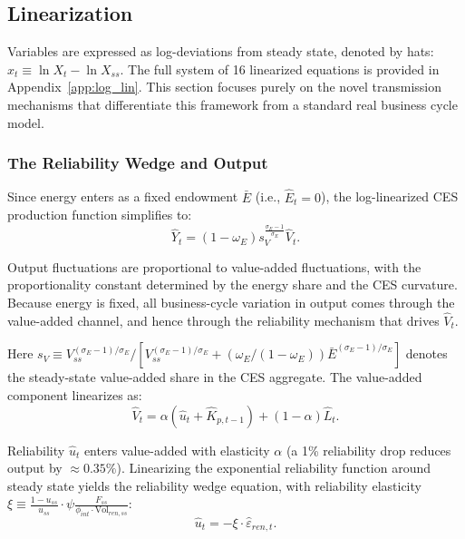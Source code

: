 	

	\subsection{Linearization}

Variables are expressed as log-deviations from steady state, denoted by hats: $\hat{x}_t \equiv \ln X_t - \ln X_{ss}$. The full system of 16 linearized equations is provided in Appendix~\ref{app:log_lin}. This section focuses purely on the novel transmission mechanisms that differentiate this framework from a standard real business cycle model.

\subsubsection{The Reliability Wedge and Output}

Since energy enters as a fixed endowment $\bar{E}$ (i.e., $\hat{E}_t = 0$), the log-linearized CES production function simplifies to:
	\begin{equation}
		\hat{Y}_t = (1-\omega_E) s_V^{\frac{\sigma_E - 1}{\sigma_E}} \hat{V}_t
		\label{eq:output_lin}.
	\end{equation}
	
	Output fluctuations are proportional to value-added fluctuations, with the proportionality constant determined by the energy share and the CES curvature. Because energy is fixed, all business-cycle variation in output comes through the value-added channel, and hence through the reliability mechanism that drives $\hat{V}_t$.
	
	Here $s_V \equiv V_{ss}^{(\sigma_E-1)/\sigma_E} / [V_{ss}^{(\sigma_E-1)/\sigma_E} + (\omega_E/(1-\omega_E)) \bar{E}^{(\sigma_E-1)/\sigma_E}]$ denotes the steady-state value-added share in the CES aggregate. The value-added component linearizes as:
	\begin{equation}
		\hat{V}_t = \alpha(\hat{u}_t + \hat{K}_{p,t-1}) + (1-\alpha)\hat{L}_t
		\label{eq:va_lin}.
	\end{equation}
	
	Reliability $\hat{u}_t$ enters value-added with elasticity $\alpha$ (a 1\% reliability drop reduces output by $\approx 0.35\%$). Linearizing the exponential reliability function around steady state yields the reliability wedge equation, with reliability elasticity $\xi \equiv \frac{1-u_{ss}}{u_{ss}} \cdot \psi \frac{F_{ss}}{\phi_{int} \cdot \text{Vol}_{ren,ss}}$:
	\begin{equation}
		\hat{u}_t = -\xi \cdot \hat{\varepsilon}_{ren,t}
		\label{eq:reliability_lin}.
	\end{equation}
	
